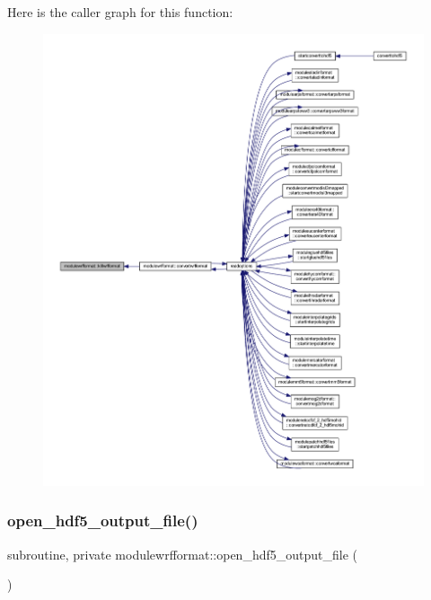 Here is the caller graph for this function\+:\nopagebreak
\begin{figure}[H]
\begin{center}
\leavevmode
\includegraphics[width=350pt]{namespacemodulewrfformat_a5b240148e53caa6048e5a298bb4b0376_icgraph}
\end{center}
\end{figure}
\mbox{\label{namespacemodulewrfformat_a477dfcb5abd2d3fef1a7de09f09e0216}} 
\subsubsection{\texorpdfstring{open\+\_\+hdf5\+\_\+output\+\_\+file()}{open\_hdf5\_output\_file()}}
{\footnotesize\ttfamily subroutine, private modulewrfformat\+::open\+\_\+hdf5\+\_\+output\+\_\+file (\begin{DoxyParamCaption}{ }\end{DoxyParamCaption})\hspace{0.3cm}{\ttfamily [private]}}

